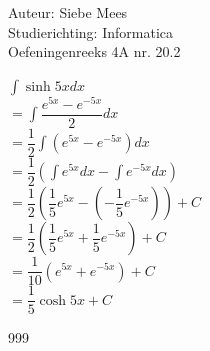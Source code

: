 \documentclass[a4paper]{article}
\begin{document}
  
\noindent \large Auteur: Siebe Mees \\
\noindent \large Studierichting: Informatica\\
\noindent \large Oefeningenreeks 4A nr. 20.2\\

\medskip

\normalsize

$ \displaystyle\int \sinh 5x dx $\\

$ = \displaystyle\int \dfrac{e^{5x}-e^{-5x}}{2} dx $\\

$ = \dfrac{1}{2}\displaystyle\int \left(e^{5x}-e^{-5x}\right) dx $\\

$ = \dfrac{1}{2}\left(\displaystyle\int e^{5x} dx - \displaystyle\int e^{-5x} dx\right) $\\

$ = \dfrac{1}{2}\left(\dfrac{1}{5}e^{5x} - \left(-\dfrac{1}{5}e^{-5x}\right)\right) + C $\\

$ = \dfrac{1}{2}\left(\dfrac{1}{5}e^{5x} + \dfrac{1}{5}e^{-5x}\right) + C $\\

$ = \dfrac{1}{10}\left(e^{5x}+e^{-5x}\right) + C $\\

$ = \dfrac{1}{5}\cosh 5x + C $\\

\begin{thebibliography}{999}
\end{thebibliography}
\end{document}
